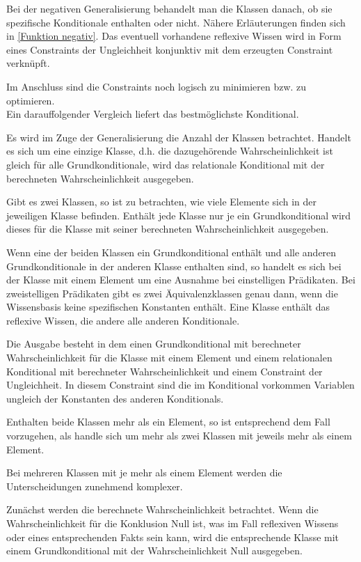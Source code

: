 \documentclass[draft]{scrreprt}
\begin{document}
{Bei der negativen Generalisierung behandelt man die Klassen danach, ob sie spezifische Konditionale enthalten oder nicht. Nähere Erläuterungen finden sich in \ref{Funktion negativ}.
Das eventuell vorhandene reflexive Wissen wird in Form eines Constraints der Ungleichheit konjunktiv mit dem erzeugten Constraint verknüpft.

Im Anschluss sind die Constraints noch logisch zu minimieren bzw. zu optimieren.\\
Ein darauffolgender Vergleich liefert das bestmöglichste Konditional.


Es wird im Zuge der Generalisierung die Anzahl der Klassen betrachtet. Handelt es sich um eine einzige Klasse, d.h. die dazugehörende Wahrscheinlichkeit ist gleich für alle Grundkonditionale, wird das relationale Konditional mit der berechneten Wahrscheinlichkeit ausgegeben.

Gibt es zwei Klassen, so ist zu betrachten, wie viele Elemente sich in der jeweiligen Klasse befinden. Enthält jede Klasse nur je ein Grundkonditional wird dieses für die Klasse mit seiner berechneten Wahrscheinlichkeit ausgegeben.

Wenn eine der beiden Klassen ein Grundkonditional enthält und alle anderen Grundkonditionale in der anderen Klasse enthalten sind, so handelt es sich bei der Klasse mit einem Element um eine Ausnahme bei einstelligen Prädikaten. Bei zweistelligen Prädikaten gibt es zwei Äquivalenzklassen genau dann, wenn die Wissensbasis keine spezifischen Konstanten enthält. Eine Klasse enthält das reflexive Wissen, die andere alle anderen Konditionale.

Die Ausgabe besteht in dem einen Grundkonditional mit berechneter Wahrscheinlichkeit für die Klasse mit einem Element und einem relationalen Konditional mit berechneter Wahrscheinlichkeit und einem Constraint der Ungleichheit. In diesem Constraint sind die im Konditional vorkommen Variablen ungleich der Konstanten des anderen Konditionals. 

Enthalten beide Klassen mehr als ein Element, so ist entsprechend dem Fall vorzugehen, als handle sich um mehr als zwei Klassen mit jeweils mehr als einem Element.

Bei mehreren Klassen mit je mehr als einem Element werden die Unterscheidungen zunehmend komplexer.

Zunächst werden die berechnete Wahrscheinlichkeit betrachtet. Wenn die Wahrscheinlichkeit für die Konklusion Null ist, was im Fall reflexiven Wissens oder eines entsprechenden Fakts sein kann, wird die entsprechende Klasse mit einem Grundkonditional mit der Wahrscheinlichkeit Null ausgegeben.

}
\end{document}
